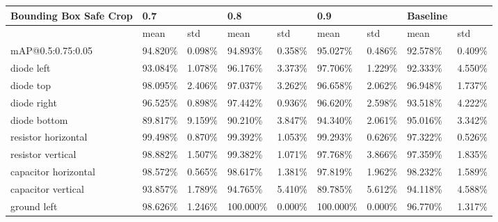 
\begin{table}[H]
\scriptsize %
\begin{center}
\begin{tabular}{|l|l|l|l|l|l|l|l|l|}
\hline
Bounding Box Safe Crop          & 0.7      &          & 0.8      &          & \cellcolor{green}0.9      &          & Baseline &              \\
\hline
                                & mean     & std      & mean     & std      & mean     & std      & mean     & std          \\
\hline
mAP@0.5:0.75:0.05               & 94.820\%  & 0.098\% & 94.893\%  & 0.358\% & \cellcolor{green}95.027\%  & 0.486\%  & 92.578\%  & 0.409\%   \\
\hline
\rowcolor{lightgray!50}
diode left                      & 93.084\%  & 1.078\% & 96.176\%  & 3.373\% & 97.706\%  & 1.229\%  & 92.333\%  & 4.550\%   \\
diode top                       & 98.095\%  & 2.406\% & 97.037\%  & 3.262\% & 96.658\%  & 2.062\%  & 96.948\%  & 1.737\%   \\
\rowcolor{lightgray!50}
diode right                     & 96.525\%  & 0.898\% & 97.442\%  & 0.936\% & 96.620\%  & 2.598\%  & 93.518\%  & 4.222\%   \\
diode bottom                    & 89.817\%  & 9.159\% & 90.210\%  & 3.847\% & 94.340\%  & 2.061\%  & 95.016\%  & 3.342\%   \\
\rowcolor{lightgray!50}
resistor horizontal             & 99.498\%  & 0.870\% & 99.392\%  & 1.053\% & 99.293\%  & 0.626\%  & 97.322\%  & 0.526\%   \\
resistor vertical               & 98.882\%  & 1.507\% & 99.382\%  & 1.071\% & 97.768\%  & 3.866\%  & 97.359\%  & 1.835\%   \\
\rowcolor{lightgray!50}
capacitor horizontal            & 98.572\%  & 0.565\% & 98.617\%  & 1.381\% & 97.819\%  & 1.962\%  & 98.232\%  & 1.589\%   \\
capacitor vertical              & 93.857\%  & 1.789\% & 94.765\%  & 5.410\% & 89.785\%  & 5.612\%  & 94.118\%  & 4.588\%   \\
\rowcolor{lightgray!50}
ground left                     & 98.626\%  & 1.246\% & 100.000\% & 0.000\% & 100.000\% & 0.000\%  & 96.770\%  & 1.317\%   \\

\end{tabular}
\end{center}
\end{table}
